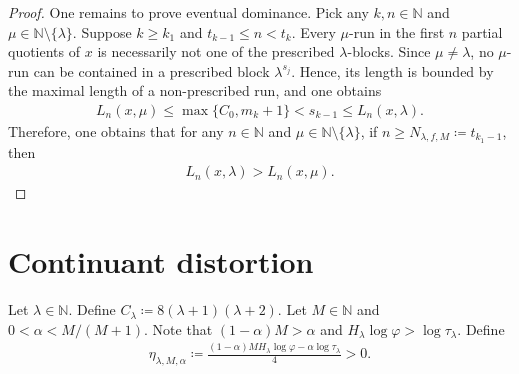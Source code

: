 \documentclass[10pt,a4paper]{amsart}
\begin{document}
\begin{proof}
One remains to prove eventual dominance. Pick any $k,n\in\mathbb{N}$ and $\mu\in\mathbb{N}\setminus\{\lambda\}$. Suppose $k\geq k_1$ and $t_{k-1}\leq n< t_k$. Every $\mu$-run in the first $n$ partial quotients of $x$ is necessarily not one of the prescribed $\lambda$-blocks. Since $\mu\neq\lambda$, no $\mu$-run can be contained in a prescribed block $\lambda^{s_j}$. Hence, its length is bounded by the maximal length of a non-prescribed run, and one obtains
\begin{align*}
    L_n(x,\mu)\leq\max{\{C_0,m_k+1\}}<s_{k-1}\leq L_n(x,\lambda).
\end{align*}
Therefore, one obtains that for any $n\in\mathbb N$ and $\mu\in\mathbb{N}\setminus\{\lambda\}$, if $n\geq N_{\lambda,f,M}\coloneqq t_{k_1-1}$, then
\begin{align*}
    L_n(x,\lambda)>L_n(x,\mu).
\end{align*}
\end{proof}

\section{Continuant distortion}

Let $\lambda\in\mathbb{N}$. Define $C_\lambda\coloneqq8(\lambda+1)(\lambda+2)$. Let $M\in\mathbb{N}$ and $0<\alpha<M/(M+1)$. Note that $(1-\alpha)M>\alpha$ and $H_\lambda\log{\varphi}>\log{\tau_\lambda}$. Define
\begin{align*}
    \eta_{\lambda,M,\alpha}
    \coloneqq\frac{(1-\alpha)MH_\lambda\log\varphi-\alpha\log \tau_\lambda}{4}>0.
\end{align*}
\end{document}
